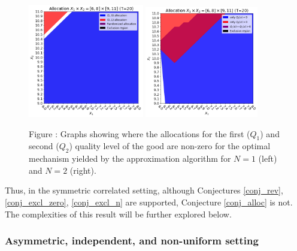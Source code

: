 \begin{figure}[H]
    \begin{center}
    \includegraphics[width=0.45\textwidth]{images/belloni_alloc_n1.png}
    \includegraphics[width=0.44\textwidth]{images/belloni_alloc_n2.png}
    \end{center}
    
    \vspace{1mm}
    \raggedright{\small {\sc Figure \thefig\label{fig:belloni_alloc_alln}:} Graphs showing where the allocations for the first ($Q_1$) and second ($Q_2$) quality level of the good are non-zero for the optimal mechanism yielded by the approximation algorithm for $N=1$ (left) and $N=2$ (right).} 
\end{figure}

Thus, in the symmetric correlated setting, although Conjectures \ref{conj_rev}, \ref{conj_excl_zero}, \ref{conj_excl_n} are supported, Conjecture \ref{conj_alloc} is not. The complexities of this result will be further explored below.







\subsubsection{Asymmetric, independent, and non-uniform setting}

